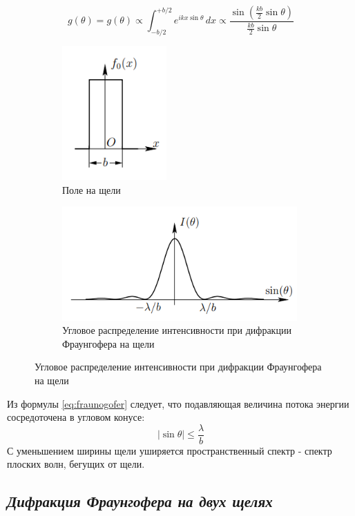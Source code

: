 \begin{equation}
    g(\theta) = g(\theta) \propto \int_{-b/2}^{+b/2} e^{ikx \sin \theta} \, dx \propto \frac{\sin \left( \frac{kb}{2} \sin \theta \right)}{\frac{kb}{2} \sin \theta} \label{eq:fraunogofer}
\end{equation}

\begin{figure}[h!]
    \centering
    \begin{subfigure}{0.38\linewidth}
        \centering
        \includegraphics[width=4cm]{images/fraungofer_1.png}
        \caption{Поле на щели}
    \end{subfigure}
    \hfill
    \begin{subfigure}{0.6\linewidth}
        \centering
        \includegraphics[width=9cm]{images/fraungofer_2.png}
        \caption{Угловое распределение интенсивности при дифракции Фраунгофера на щели}
    \end{subfigure}
\end{figure}

\indent Из формулы \ref{eq:fraunogofer} следует, что подавляющая величина потока энергии сосредоточена  в угловом конусе:
\begin{equation}
    |\sin\theta| \le \frac{\lambda}{b}
\end{equation}
С уменьшением ширины щели уширяется пространственный спектр - спектр плоских волн, бегущих от щели.

\subsection*{\textit{Дифракция Фраунгофера на двух щелях}}

